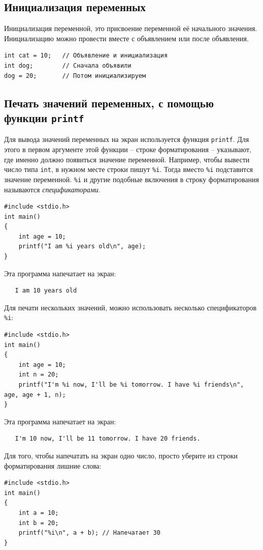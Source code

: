 \documentclass[10pt]{article}
\begin{document}
\subsection*{Инициализация переменных}
Инициализация переменной, это присвоение переменной её начального значения. Инициализацию можно провести вместе с объявлением или после объявления.
\begin{lstlisting}
int cat = 10;	// Объявление и инициализация
int dog;		// Сначала объявили
dog = 20;       // Потом инициализируем
\end{lstlisting}

\subsection*{Печать значений переменных, с помощью функции \texttt{printf}}
Для вывода значений переменных на экран используется функция \texttt{printf}.
Для этого в первом аргументе этой функции -- строке форматирования -- указывают, где именно должно появиться значение переменной. Например, чтобы вывести число типа \texttt{int}, в нужном месте строки пишут \texttt{\%i}. Тогда вместо  \texttt{\%i}  подставится значение переменной. \texttt{\%i} и другие подобные включения в строку форматирования называются \textit{спецификаторами}.
\begin{lstlisting}
#include <stdio.h>
int main()
{
    int age = 10;
    printf("I am %i years old\n", age);
}
\end{lstlisting}
Эта программа напечатает на экран:
\begin{verbatim}
   I am 10 years old
\end{verbatim}
Для печати нескольких значений, можно использовать несколько спецификаторов \texttt{\%i}:
\begin{lstlisting}
#include <stdio.h>
int main()
{
    int age = 10;
    int n = 20;
    printf("I'm %i now, I'll be %i tomorrow. I have %i friends\n", age, age + 1, n);
}
\end{lstlisting}
Эта программа напечатает на экран:
\begin{verbatim}
   I'm 10 now, I'll be 11 tomorrow. I have 20 friends.
\end{verbatim}
Для того, чтобы напечатать на экран одно число, просто уберите из строки форматирования лишние слова:
\begin{lstlisting}
#include <stdio.h>
int main()
{
    int a = 10;
    int b = 20;
    printf("%i\n", a + b); // Напечатает 30
}
\end{lstlisting}
\end{document}
